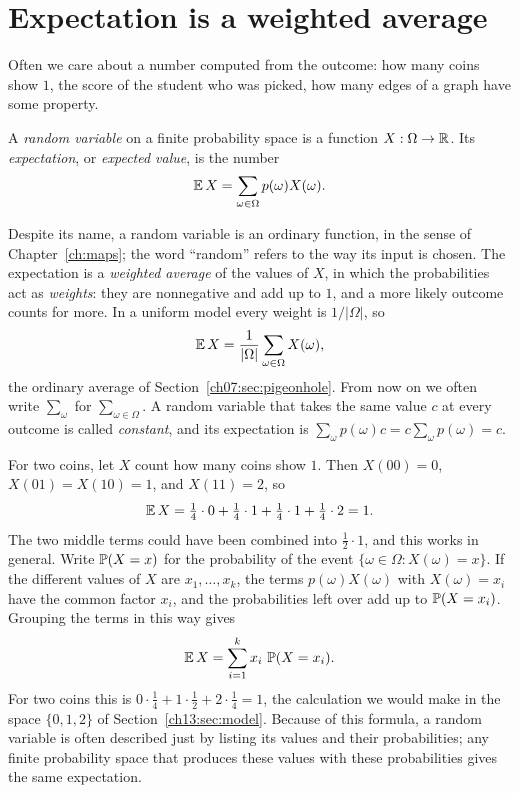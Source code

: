\section{Expectation is a weighted average}\label{ch13:sec:expectation}
Often we care about a number computed from the outcome: how many coins show $1$, the score of the student who was picked, how many edges of a graph have some property.

\par\noindent\begin{minipage}{\linewidth}
\begin{definition}\label{ch13:def:expectation}
A \emph{random variable} on a finite probability space is a function $X:\Omega\to\mathbb R$. Its \emph{expectation}, or \emph{expected value}, is the number
\[
\operatorname{\mathbb E} X=\sum_{\omega\in\Omega}p(\omega)X(\omega).
\]
\end{definition}
\end{minipage}\par

Despite its name, a random variable is an ordinary function, in the sense of Chapter~\ref{ch:maps}; the word ``random'' refers to the way its input is chosen. The expectation is a \emph{weighted average} of the values of $X$, in which the probabilities act as \emph{weights}: they are nonnegative and add up to $1$, and a more likely outcome counts for more. In a uniform model every weight is $1/|\Omega|$, so
\[
\operatorname{\mathbb E} X=\frac1{|\Omega|}\sum_{\omega\in\Omega}X(\omega),
\]
the ordinary average of Section~\ref{ch07:sec:pigeonhole}. From now on we often write $\sum_\omega$ for $\sum_{\omega\in\Omega}$. A random variable that takes the same value $c$ at every outcome is called \emph{constant}, and its expectation is $\sum_\omega p(\omega)c=c\sum_\omega p(\omega)=c$.

For two coins, let $X$ count how many coins show $1$. Then $X(00)=0$, $X(01)=X(10)=1$, and $X(11)=2$, so
\[
\operatorname{\mathbb E} X=\tfrac14\cdot0+\tfrac14\cdot1+\tfrac14\cdot1+\tfrac14\cdot2=1.
\]
The two middle terms could have been combined into $\tfrac12\cdot1$, and this works in general. Write $\operatorname{\mathbb P}(X=x)$ for the probability of the event $\{\omega\in\Omega:X(\omega)=x\}$. If the different values of $X$ are $x_1,\ldots,x_k$, the terms $p(\omega)X(\omega)$ with $X(\omega)=x_i$ have the common factor $x_i$, and the probabilities left over add up to $\operatorname{\mathbb P}(X=x_i)$. Grouping the terms in this way gives
\[
\operatorname{\mathbb E} X=\sum_{i=1}^{k}x_i\,\operatorname{\mathbb P}(X=x_i).
\]
For two coins this is $0\cdot\tfrac14+1\cdot\tfrac12+2\cdot\tfrac14=1$, the calculation we would make in the space $\{0,1,2\}$ of Section~\ref{ch13:sec:model}. Because of this formula, a random variable is often described just by listing its values and their probabilities; any finite probability space that produces these values with these probabilities gives the same expectation.

